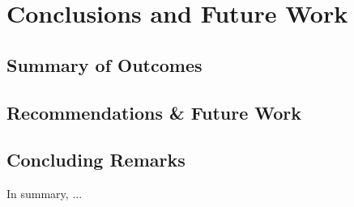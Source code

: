 \chapter{Conclusions and Future Work}\label{chap:conclusion}

\section{Summary of Outcomes}\label{sec:summary_Ch7}

\section{Recommendations \& Future Work}\label{sec:future_Ch7}

\section{Concluding Remarks}

In summary, ...
